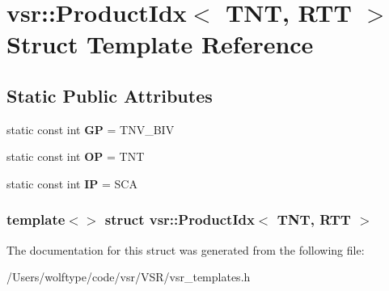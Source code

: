 \hypertarget{structvsr_1_1_product_idx_3_01_t_n_t_00_01_r_t_t_01_4}{\section{vsr\-:\-:Product\-Idx$<$ T\-N\-T, R\-T\-T $>$ Struct Template Reference}
\label{structvsr_1_1_product_idx_3_01_t_n_t_00_01_r_t_t_01_4}
}
\subsection*{Static Public Attributes}
\begin{DoxyCompactItemize}
\item 
\hypertarget{structvsr_1_1_product_idx_3_01_t_n_t_00_01_r_t_t_01_4_a85f25fa6f88946bc93f67280e053740c}{static const int {\bfseries G\-P} = T\-N\-V\-\_\-\-B\-I\-V}\label{structvsr_1_1_product_idx_3_01_t_n_t_00_01_r_t_t_01_4_a85f25fa6f88946bc93f67280e053740c}

\item 
\hypertarget{structvsr_1_1_product_idx_3_01_t_n_t_00_01_r_t_t_01_4_aaf6bd521a2875c90c591cc9d767ba35b}{static const int {\bfseries O\-P} = T\-N\-T}\label{structvsr_1_1_product_idx_3_01_t_n_t_00_01_r_t_t_01_4_aaf6bd521a2875c90c591cc9d767ba35b}

\item 
\hypertarget{structvsr_1_1_product_idx_3_01_t_n_t_00_01_r_t_t_01_4_a9960d5f7934e1edc8b98ef90335efb04}{static const int {\bfseries I\-P} = S\-C\-A}\label{structvsr_1_1_product_idx_3_01_t_n_t_00_01_r_t_t_01_4_a9960d5f7934e1edc8b98ef90335efb04}

\end{DoxyCompactItemize}
\subsubsection*{template$<$$>$ struct vsr\-::\-Product\-Idx$<$ T\-N\-T, R\-T\-T $>$}



The documentation for this struct was generated from the following file\-:\begin{DoxyCompactItemize}
\item 
/\-Users/wolftype/code/vsr/\-V\-S\-R/vsr\-\_\-templates.\-h\end{DoxyCompactItemize}
